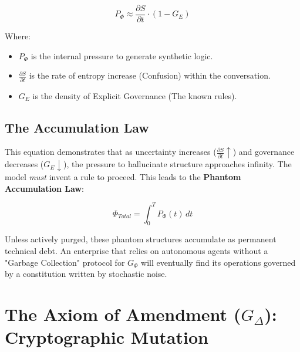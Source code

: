\documentclass[11pt, a4paper]{article}
\newcommand{\Ge}{G_E}
\begin{document}
\begin{equation}
    \label{eq:phantom_pressure}
    P_{\Phi} \approx \frac{\partial S}{\partial t} \cdot \left( 1 - \Ge \right)
\end{equation}

\noindent
Where:
\begin{itemize}
    \item $P_{\Phi}$ is the internal pressure to generate synthetic logic.
    \item $\frac{\partial S}{\partial t}$ is the rate of entropy increase (Confusion) within the conversation.
    \item $\Ge$ is the density of Explicit Governance (The known rules).
\end{itemize}

\subsection{The Accumulation Law}

This equation demonstrates that as uncertainty increases ($\frac{\partial S}{\partial t} \uparrow$) and governance decreases ($\Ge \downarrow$), the pressure to hallucinate structure approaches infinity. The model \textit{must} invent a rule to proceed. This leads to the \textbf{Phantom Accumulation Law}:

\begin{equation}
    \label{eq:phantom_accumulation}
    \Phi_{Total} = \int_{0}^{T} P_{\Phi}(t) \, dt
\end{equation}

Unless actively purged, these phantom structures accumulate as permanent technical debt. An enterprise that relies on autonomous agents without a "Garbage Collection" protocol for $G_{\Phi}$ will eventually find its operations governed by a constitution written by stochastic noise.

\section{The Axiom of Amendment ($G_{\Delta}$): Cryptographic Mutation}
\label{sec:axiom_amendment}
\end{document}
